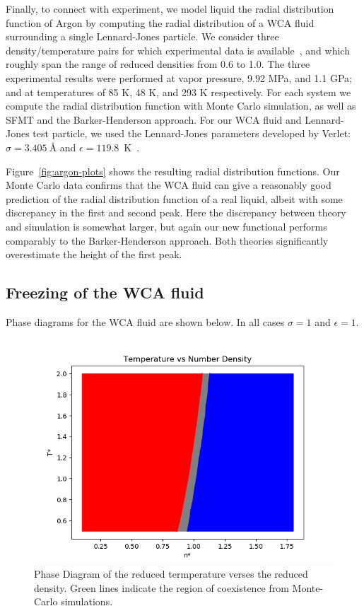 \documentclass[letterpaper,twocolumn,amsmath,amssymb,prb]{revtex4-1}
\begin{document}
Finally, to connect with experiment, we model liquid the radial
distribution function of Argon by computing the radial distribution of
a WCA fluid surrounding a single Lennard-Jones particle.  We consider
three density/temperature pairs for which experimental data is
available~\cite{mikolaj2004structure, eggert2002quantitative,
yarnell1973structure}, and which roughly span the range of reduced
densities from 0.6 to 1.0. The three experimental results were
performed at vapor pressure, 9.92 MPa, and 1.1 GPa; and at
temperatures of 85 K, 48 K, and 293 K respectively. For each system we
compute the radial distribution function with Monte Carlo simulation,
as well as SFMT and the Barker-Henderson approach.  For our WCA fluid
and Lennard-Jones test particle, we used the Lennard-Jones parameters
developed by Verlet: $\sigma = 3.405 ~\textrm{\AA}$ and $\epsilon =
119.8$~K~\cite{verlet1967computer}.

Figure~\ref{fig:argon-plots} shows the resulting radial distribution
functions.  Our Monte Carlo data confirms that the WCA fluid can give
a reasonably good prediction of the radial distribution function of a
real liquid, albeit with some discrepancy in the first and second
peak.  Here the discrepancy between theory and simulation is somewhat
larger, but again our new functional performs comparably to the
Barker-Henderson approach.  Both theories significantly overestimate
the height of the first peak.




\subsection{Freezing of the WCA fluid}

Phase diagrams for the WCA fluid are shown below. In all cases $\sigma=1$ and $\epsilon=1$.

\begin{figure}
 \centering
  \includegraphics[width=\columnwidth]{figs/Phase_Diagram_of_T_vs_n}
\caption{Phase Diagram of the reduced termperature verses the reduced density. Green lines indicate the region of coexistence from Monte-Carlo simulations.}
\label{fig:Phase_Diagram_of_T_vs_n}
\end{figure}
\end{document}
